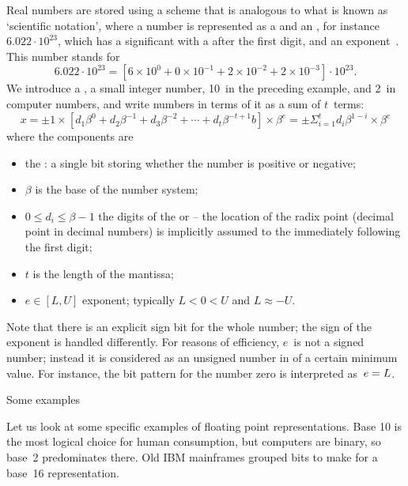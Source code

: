 Real numbers are stored using a scheme that is analogous to what is
known as `scientific notation', where a number is represented as a
 and an , for
instance~$6.022\cdot 10^{23}$, which has a significant  with a
 after the first digit, and an exponent~.
This number stands for
\[ 6.022\cdot 10^{23}= \left[
    6\times 10^0+0\times 10^{-1}+2\times10^{-2}+2\times10^{-3}
    \right] \cdot 10^{23}. 
\]
We introduce a , 
a small integer number, 10~in the preceding example, and 2~in computer
numbers, and write numbers in terms of it as a sum of $t$~terms:
\begin{equation}
    x = \pm 1 \times \left[
       d_1\beta^0+d_2\beta^{-1}+d_3\beta^{-2}+\cdots+d_t\beta^{-t+1}b\right] \times \beta^e =
       \pm \Sigma_{i=1}^t d_i\beta^{1-i}  \times\beta^e
       \label{eq:floatingpoint-def}
\end{equation}
where the components are
\begin{itemize}
\item the : a single bit storing whether the
  number is positive or negative;
\item $\beta$ is the base of the number system;
\item $0\leq d_i\leq \beta-1$ the digits of the 
  or  -- the location of the radix point
  (decimal point in decimal numbers) is implicitly assumed to the
  immediately following the first digit;
\item $t$ is the length of the mantissa;
\item $e\in [L,U]$ exponent; typically $L<0<U$ and $L\approx-U$.
\end{itemize}

Note that there is an explicit sign bit for the whole number; the sign
of the exponent is handled differently. 
For reasons of efficiency, $e$~is not a signed number; instead it is
considered as an unsigned number in  of a certain minimum
value. For instance, the bit pattern for the number zero is
interpreted as~$e=\nobreak L$.

 {Some examples}

Let us look at some specific examples of floating point
representations. Base 10 is the most logical choice for human
consumption, but computers are binary, so base~2 predominates
there. Old IBM mainframes grouped bits to make for a base~16
representation.

